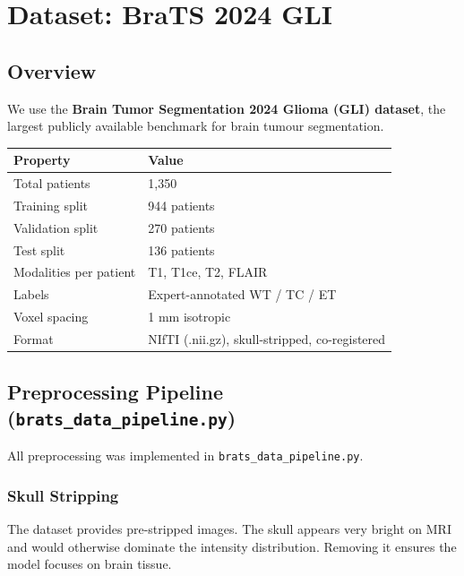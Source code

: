 \documentclass[12pt,a4paper]{article}
\newcommand{\term}[1]{\textbf{\textcolor{mainblue}{#1}}}
\newcommand{\code}[1]{\texttt{\small #1}}
\begin{document}
\section{Dataset: BraTS 2024 GLI}

\subsection{Overview}

We use the \term{Brain Tumor Segmentation 2024 Glioma (GLI) dataset}, the largest publicly available benchmark for brain tumour segmentation.

\begin{center}
\begin{tabular}{ll}
\toprule
\textbf{Property} & \textbf{Value} \\
\midrule
Total patients & 1,350 \\
Training split & 944 patients \\
Validation split & 270 patients \\
Test split & 136 patients \\
Modalities per patient & T1, T1ce, T2, FLAIR \\
Labels & Expert-annotated WT / TC / ET \\
Voxel spacing & 1 mm isotropic \\
Format & NIfTI (.nii.gz), skull-stripped, co-registered \\
\bottomrule
\end{tabular}
\end{center}

\subsection{Preprocessing Pipeline (\texttt{brats\_data\_pipeline.py})}

All preprocessing was implemented in \code{brats\_data\_pipeline.py}.

\subsubsection{Skull Stripping}
The dataset provides pre-stripped images. The skull appears very bright on MRI and would otherwise dominate the intensity distribution. Removing it ensures the model focuses on brain tissue.
\end{document}
